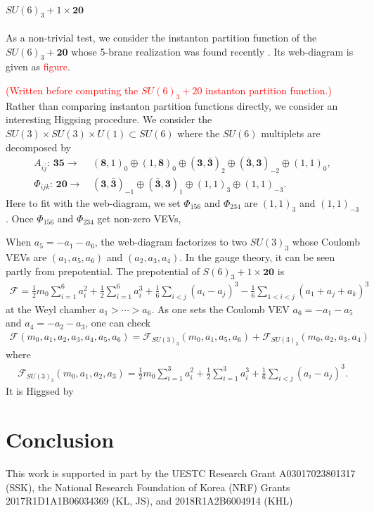 \documentclass[letterpaper, 11pt]{article}
\begin{document}
\paragraph{$SU(6)_3+1\times\boldsymbol{20}$}

As a non-trivial test, we consider the instanton partition function of the $SU(6)_3+\boldsymbol{20}$ whose 5-brane realization was found recently \cite{Hayashi:2019yxj}. Its web-diagram is given as \textcolor{red}{figure}.

\textcolor{red}{(Written before computing the $SU(6)_3+20$ instanton partition function.)}\\
Rather than comparing instanton partition functions directly, we consider an interesting Higgsing procedure. We consider the $SU(3)\times SU(3)\times U(1)\subset SU(6)$ where the $SU(6)$ multiplets are decomposed by
\begin{align}
A_{i\bar{j}}:\,\boldsymbol{35}\longrightarrow&\,(\boldsymbol{8},1)_0\oplus (1,\boldsymbol{8})_0\oplus (\boldsymbol{3},\bar{\boldsymbol{3}})_2\oplus(\bar{\boldsymbol{3}},\boldsymbol{3})_{-2}\oplus(1,1)_0,\nonumber\\
\Phi_{ijk}:\,\boldsymbol{20}\longrightarrow&\,(\boldsymbol{3},\bar{\boldsymbol{3}})_{-1}\oplus(\bar{\boldsymbol{3}},\boldsymbol{3})_1\oplus(1,1)_3\oplus(1,1)_{-3}.
\end{align} 
Here to fit with the web-diagram, we set $\Phi_{156}$ and $\Phi_{234}$ are $(1,1)_3$ and $(1,1)_{-3}$. Once $\Phi_{156}$ and $\Phi_{234}$ get non-zero VEVs, 

 When $a_5=-a_1-a_6$, the web-diagram factorizes to two $SU(3)_3$ whose Coulomb VEVs are $(a_1, a_5, a_6)$ and $(a_2, a_3, a_4)$. In the gauge theory, it can be seen partly from prepotential. The prepotential of $S(6)_3+1\times\boldsymbol{20}$ is
\begin{align}
\mathcal{F}=\frac{1}{2}m_0\sum_{i=1}^{6}a_i^2+\frac{1}{2}\sum_{i=1}^{6}a_i^3+\frac{1}{6}\sum_{i<j}(a_i-a_j)^3-\frac{1}{6}\sum_{1<i<j}(a_1+a_j+a_k)^3
\end{align}
at the Weyl chamber $a_1>\cdots>a_6$. As one sets the Coulomb VEV $a_6=-a_1-a_5$ and $a_4=-a_2-a_3$, one can check
\begin{align}
\mathcal{F}(m_0,a_1,a_2,a_3,a_4,a_5,a_6)=\mathcal{F}_{SU(3)_3}(m_0,a_1,a_5,a_6)+\mathcal{F}_{SU(3)_3}(m_0,a_2,a_3,a_4)
\end{align}
where
\begin{align}
\mathcal{F}_{SU(3)_3}(m_0,a_1,a_2,a_3)=\frac{1}{2}m_0\sum_{i=1}^{3}a_i^2+\frac{1}{2}\sum_{i=1}^{3}a_i^3+\frac{1}{6}\sum_{i<j}(a_i-a_j)^3.
\end{align}
It is Higgsed by 


\section{Conclusion} \label{sec:conclusion}


\acknowledgments
This work is supported in part by the UESTC Research Grant A03017023801317 (SSK), the National Research Foundation of Korea (NRF) Grants 2017R1D1A1B06034369 (KL, JS), and 2018R1A2B6004914 (KHL)




\end{document}
